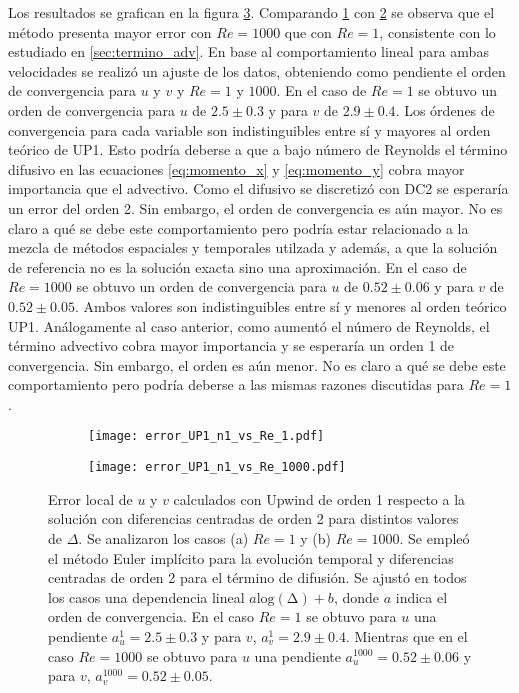 \documentclass[aps,prb,twocolumn,superscriptaddress,floatfix,longbibliography,10pt]{revtex4-2}
\newcounter{para}
\begin{document}
Los resultados se grafican en la figura \ref{fig:error_UP1_n1_vs_Re}. Comparando \ref{fig:error_UP1_n1_vs_Re_1} con \ref{fig:error_UP1_n1_vs_Re_1000} se observa que el método presenta mayor error con $Re = 1000$ que con $Re = 1$, consistente con lo estudiado en \ref{sec:termino_adv}. En base al comportamiento lineal para ambas velocidades se realizó un ajuste de los datos, obteniendo como pendiente el orden de convergencia para $u$ y $v$ y $Re = 1$ y $1000$. En el caso de $Re = 1$ se obtuvo un orden de convergencia para $u$ de $2.5 \pm 0.3$ y para $v$ de $2.9 \pm 0.4$. Los órdenes de convergencia para cada variable son indistinguibles entre sí y mayores al orden teórico de UP1. Esto podría deberse a que a bajo número de Reynolds el término difusivo en las ecuaciones \ref{eq:momento_x} y \ref{eq:momento_y} cobra mayor importancia que el advectivo. Como el difusivo se discretizó con DC2 se esperaría un error del orden 2. Sin embargo, el orden de convergencia es aún mayor. No es claro a qué se debe este comportamiento pero podría estar relacionado a la mezcla de métodos espaciales y temporales utilzada y además, a que la solución de referencia no es la solución exacta sino una aproximación. En el caso de $Re = 1000$ se obtuvo un orden de convergencia para $u$ de $0.52 \pm 0.06$ y para $v$ de $0.52 \pm 0.05$. Ambos valores son indistinguibles entre sí y menores al orden teórico UP1. Análogamente al caso anterior, como aumentó el número de Reynolds, el término advectivo cobra mayor importancia y se esperaría un orden 1 de convergencia. Sin embargo, el orden es aún menor. No es claro a qué se debe este comportamiento pero podría deberse a las mismas razones discutidas para $Re = 1$.

\begin{figure}
  \centering
  \begin{subfigure}[b]{0.45\textwidth}
      \centering
      \texttt{[image: error\_UP1\_n1\_vs\_Re\_1.pdf]}
      \caption{}
      \label{fig:error_UP1_n1_vs_Re_1}
  \end{subfigure}
  \hfill
  \begin{subfigure}[b]{0.45\textwidth}
      \centering
      \texttt{[image: error\_UP1\_n1\_vs\_Re\_1000.pdf]}
      \caption{}
      \label{fig:error_UP1_n1_vs_Re_1000}
  \end{subfigure}
     \caption{Error local de $u$ y $v$ calculados con Upwind de orden 1 respecto a la solución con diferencias centradas de orden 2 para distintos valores de $\Delta$. Se analizaron los casos (a) $Re = 1$ y (b) $Re = 1000$. Se empleó el método Euler implícito para la evolución temporal y diferencias centradas de orden 2 para el término de difusión. Se ajustó en todos los casos una dependencia lineal $a \mathrm{log(\Delta)} + b$, donde $a$ indica el orden de convergencia. En el caso $Re = 1$ se obtuvo para $u$ una pendiente $a_{u}^1 = 2.5 \pm 0.3$ y para $v$, $a_{v}^1 = 2.9 \pm 0.4$. Mientras que en el caso $Re = 1000$ se obtuvo para $u$ una pendiente $a_u^{1000} = 0.52 \pm 0.06$ y para $v$, $a_v^{1000} = 0.52 \pm 0.05$.
     }
     \label{fig:error_UP1_n1_vs_Re}
\end{figure}
\end{document}
